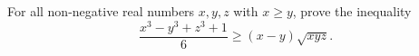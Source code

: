 For all non-negative real numbers $x,y,z$ with $x \geq y$,  prove the inequality$$\frac{x^3-y^3+z^3+1}{6}\geq (x-y)\sqrt{xyz}.$$